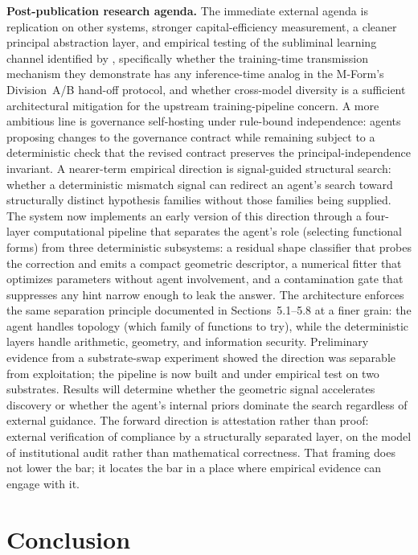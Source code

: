 \documentclass[11pt]{article}
\begin{document}
\textbf{Post-publication research agenda.} The immediate external agenda is replication on other systems, stronger capital-efficiency measurement, a cleaner principal abstraction layer, and empirical testing of the subliminal learning channel identified by \citet{cloud2026}, specifically whether the training-time transmission mechanism they demonstrate has any inference-time analog in the M-Form's Division~A/B hand-off protocol, and whether cross-model diversity is a sufficient architectural mitigation for the upstream training-pipeline concern. A more ambitious line is governance self-hosting under rule-bound independence: agents proposing changes to the governance contract while remaining subject to a deterministic check that the revised contract preserves the principal-independence invariant. A nearer-term empirical direction is signal-guided structural search: whether a deterministic mismatch signal can redirect an agent's search toward structurally distinct hypothesis families without those families being supplied. The system now implements an early version of this direction through a four-layer computational pipeline that separates the agent's role (selecting functional forms) from three deterministic subsystems: a residual shape classifier that probes the correction and emits a compact geometric descriptor, a numerical fitter that optimizes parameters without agent involvement, and a contamination gate that suppresses any hint narrow enough to leak the answer. The architecture enforces the same separation principle documented in Sections~5.1--5.8 at a finer grain: the agent handles topology (which family of functions to try), while the deterministic layers handle arithmetic, geometry, and information security. Preliminary evidence from a substrate-swap experiment showed the direction was separable from exploitation; the pipeline is now built and under empirical test on two substrates. Results will determine whether the geometric signal accelerates discovery or whether the agent's internal priors dominate the search regardless of external guidance. The forward direction is attestation rather than proof: external verification of compliance by a structurally separated layer, on the model of institutional audit rather than mathematical correctness. That framing does not lower the bar; it locates the bar in a place where empirical evidence can engage with it.

\section{Conclusion}
\end{document}
